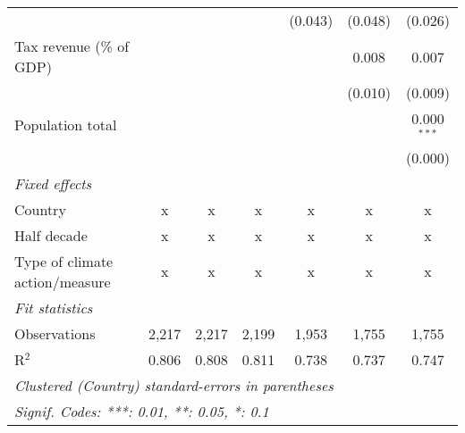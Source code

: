 \begin{tabular}{lcccccc}
                                                   &         &              &                & (0.043)       & (0.048)       & (0.026)\\   
   Tax revenue (\% of GDP)                         &         &              &                &               & 0.008         & 0.007\\   
                                                   &         &              &                &               & (0.010)       & (0.009)\\   
   Population total                                &         &              &                &               &               & 0.000$^{***}$\\   
                                                   &         &              &                &               &               & (0.000)\\   
   \emph{Fixed effects}\\
   Country                                         & x       & x            & x              & x             & x             & x\\  
   Half decade                                     & x       & x            & x              & x             & x             & x\\  
   Type of climate action/measure                  & x       & x            & x              & x             & x             & x\\  
   \midrule \emph{Fit statistics}\\
   Observations                                    & 2,217   & 2,217        & 2,199          & 1,953         & 1,755         & 1,755\\  
   R$^2$                                           & 0.806   & 0.808        & 0.811          & 0.738         & 0.737         & 0.747\\  
   \midrule
   \multicolumn{7}{l}{\emph{Clustered (Country) standard-errors in parentheses}}\\
   \multicolumn{7}{l}{\emph{Signif. Codes: ***: 0.01, **: 0.05, *: 0.1}}\\
\end{tabular}
\par\endgroup


